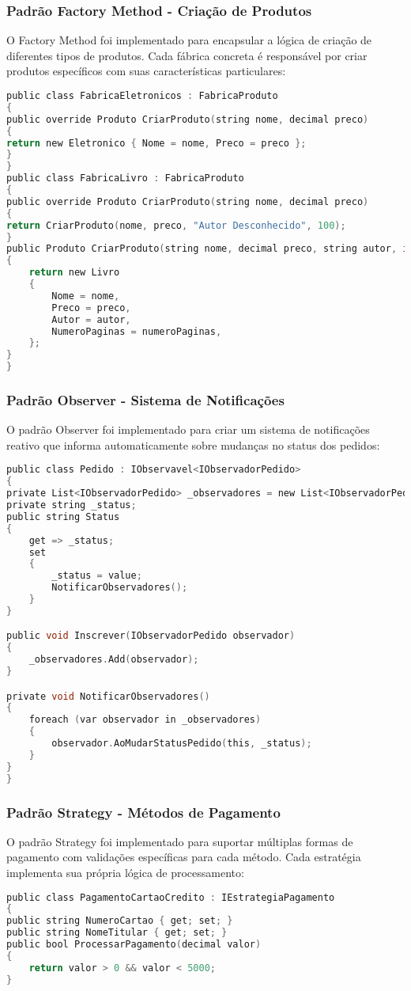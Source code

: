 \documentclass[
	12pt,				%
	oneside,			%
	a4paper,			%
	english,			%
	brazil,				%
	]{abntex2}
\begin{document}
{\subsubsection{Padrão Factory Method - Criação de Produtos}
O Factory Method foi implementado para encapsular a lógica de criação de diferentes tipos de produtos. Cada fábrica concreta é responsável por criar produtos específicos com suas características particulares:
\begin{lstlisting}[language=C]
public class FabricaEletronicos : FabricaProduto
{
public override Produto CriarProduto(string nome, decimal preco)
{
return new Eletronico { Nome = nome, Preco = preco };
}
}
public class FabricaLivro : FabricaProduto
{
public override Produto CriarProduto(string nome, decimal preco)
{
return CriarProduto(nome, preco, "Autor Desconhecido", 100);
}
public Produto CriarProduto(string nome, decimal preco, string autor, int numeroPaginas)
{
    return new Livro
    {
        Nome = nome,
        Preco = preco,
        Autor = autor,
        NumeroPaginas = numeroPaginas,
    };
}
}
\end{lstlisting}
\subsubsection{Padrão Observer - Sistema de Notificações}
O padrão Observer foi implementado para criar um sistema de notificações reativo que informa automaticamente sobre mudanças no status dos pedidos:
\begin{lstlisting}[language=C]
public class Pedido : IObservavel<IObservadorPedido>
{
private List<IObservadorPedido> _observadores = new List<IObservadorPedido>();
private string _status;
public string Status
{
    get => _status;
    set
    {
        _status = value;
        NotificarObservadores();
    }
}

public void Inscrever(IObservadorPedido observador)
{
    _observadores.Add(observador);
}

private void NotificarObservadores()
{
    foreach (var observador in _observadores)
    {
        observador.AoMudarStatusPedido(this, _status);
    }
}
}
\end{lstlisting}
\subsubsection{Padrão Strategy - Métodos de Pagamento}
O padrão Strategy foi implementado para suportar múltiplas formas de pagamento com validações específicas para cada método. Cada estratégia implementa sua própria lógica de processamento:
\begin{lstlisting}[language=C]
public class PagamentoCartaoCredito : IEstrategiaPagamento
{
public string NumeroCartao { get; set; }
public string NomeTitular { get; set; }
public bool ProcessarPagamento(decimal valor)
{
    return valor > 0 && valor < 5000;
}


\end{lstlisting}}
\end{document}
